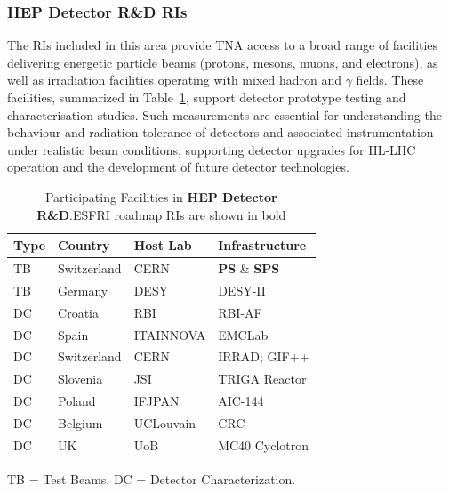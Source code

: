 \subsubsection{HEP Detector R\&D RIs}
The RIs included in this area provide TNA access to a broad range of facilities delivering energetic particle beams (protons, mesons, muons, and electrons), as well as irradiation facilities operating with mixed hadron and $\gamma$ fields. These facilities, summarized in Table~\ref{tabl:wp4-ris}, support detector prototype testing and characterisation studies. Such measurements are essential for understanding the behaviour and radiation tolerance of detectors and associated instrumentation under realistic beam conditions, supporting detector upgrades for HL-LHC operation and the development of future detector technologies.

\begin{table}[htb]
\centering
\caption{Participating Facilities in \textbf{HEP Detector R\&D}.ESFRI roadmap RIs are shown in bold}
\small
\begin{tabular}{
p{}
p{}
p{}
p{}
}
\toprule
\textbf{Type} & \textbf{Country} & \textbf{Host Lab} & \textbf{Infrastructure} \\
\midrule
TB & Switzerland & CERN & \textbf{PS} \& \textbf{SPS} \\
TB & Germany & DESY & DESY-II \\
DC & Croatia & RBI & RBI-AF \\
DC & Spain & ITAINNOVA & EMCLab \\
DC & Switzerland & CERN & IRRAD; GIF++ \\
DC & Slovenia & JSI & TRIGA Reactor \\
DC & Poland & IFJPAN & AIC-144 \\
DC & Belgium & UCLouvain & CRC \\
DC & UK & UoB & MC40 Cyclotron \\
\bottomrule
\end{tabular}

\vspace{1mm}
\raggedright
\footnotesize
TB = Test Beams,
DC = Detector Characterization.
\label{tabl:wp4-ris}
\end{table}


